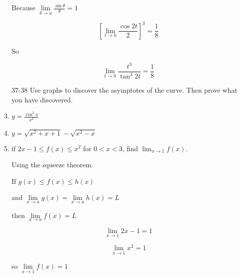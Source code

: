 \documentclass{article}
\begin{document}
\begin{enumerate}
			Because $\lim \limits _{\theta \to a} \frac{\sin \theta}{\theta} = 1$

			$$[ \lim \limits _{t \to 0} \frac{\cos 2t}{2} ]^3 = \frac{1}{8}$$

			So

			$$\lim \limits _{t \to 0} \frac{t^3}{\tan ^{3} 2t} = \frac{1}{8}$$

		\item[37-38] Use graphs to discover the asymptotes of the curve. Then prove what you have discovered.

		\item $y = \frac{\cos^2 x}{x^2}$

		\item $y = \sqrt{x^2 + x + 1} - \sqrt{x^2 - x}$

		\item if $2x - 1 \leq f(x) \leq x^2$ for $0 < x < 3$, find $\lim _{x \to 1} f(x)$.

			Using the squeeze theorem.

			If $g(x) \leq f(x) \leq h(x)$

			and $\lim \limits _{x \to a} g(x) = \lim \limits _{x \to a} h(x) = L$

			then $\lim \limits _{x \to a} f(x) = L$

			$$\lim \limits _{x \to 1} 2x - 1 = 1$$

			$$\lim \limits _{x \to 1} x^2 = 1$$

			so $\lim \limits _{x \to 1} f(x) = 1$

	\end{enumerate}
\end{document}

